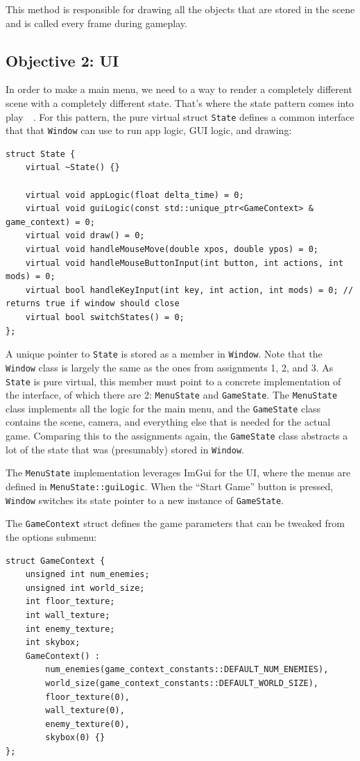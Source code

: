 \documentclass {article}
\begin{document}
This method is responsible for drawing all the objects that are stored in the scene and is called every frame during gameplay.

\subsection{Objective 2: UI}\label{sec:ui}
In order to make a main menu, we need to a way to render a completely different scene with a completely different state. That's where the state pattern comes into play~\cite{gofstate}~\cite{gamestate}. For this pattern, the pure virtual struct \texttt{State} defines a common interface that that \texttt{Window} can use to run app logic, GUI logic, and drawing:
\begin{verbatim}
struct State {
    virtual ~State() {}

    virtual void appLogic(float delta_time) = 0;
    virtual void guiLogic(const std::unique_ptr<GameContext> & game_context) = 0;
    virtual void draw() = 0;
    virtual void handleMouseMove(double xpos, double ypos) = 0;
    virtual void handleMouseButtonInput(int button, int actions, int mods) = 0;
    virtual bool handleKeyInput(int key, int action, int mods) = 0; // returns true if window should close
    virtual bool switchStates() = 0;
};
\end{verbatim}

A unique pointer to \texttt{State} is stored as a member in \texttt{Window}. Note that the \texttt{Window} class is largely the same as the ones from assignments 1, 2, and 3. As \texttt{State} is pure virtual, this member must point to a concrete implementation of the interface, of which there are 2: \texttt{MenuState} and \texttt{GameState}. The \texttt{MenuState} class implements all the logic for the main menu, and the \texttt{GameState} class contains the scene, camera, and everything else that is needed for the actual game. Comparing this to the assignments again, the \texttt{GameState} class abstracts a lot of the state that was (presumably) stored in \texttt{Window}.

The \texttt{MenuState} implementation leverages ImGui for the UI, where the menus are defined in \texttt{MenuState::guiLogic}. When the ``Start Game'' button is pressed, \texttt{Window} switches its state pointer to a new instance of \texttt{GameState}.

The \texttt{GameContext} struct defines the game parameters that can be tweaked from the options submenu:
\begin{verbatim}
struct GameContext {
    unsigned int num_enemies;
    unsigned int world_size;
    int floor_texture;
    int wall_texture;
    int enemy_texture;
    int skybox;
    GameContext() :
        num_enemies(game_context_constants::DEFAULT_NUM_ENEMIES),
        world_size(game_context_constants::DEFAULT_WORLD_SIZE),
        floor_texture(0),
        wall_texture(0),
        enemy_texture(0),
        skybox(0) {}
};
\end{verbatim}
\end{document}
